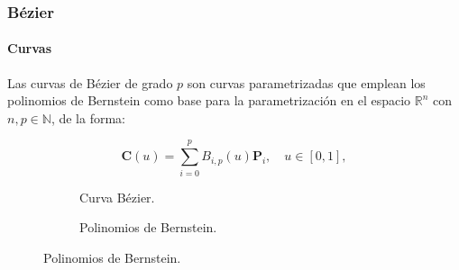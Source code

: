 \documentclass[compress]{beamer}
\newcommand\N{\mathbb{N}}
\newcommand\R{\mathbb{R}}
\begin{document}
\begin{frame}
	\frametitle{Bézier}
	\framesubtitle{Curvas} %
	
	\begin{definition}
		Las curvas de Bézier de grado $p$ son curvas parametrizadas que emplean los polinomios de Bernstein
		como base para la parametrización en el espacio $\R^n$ con $n,p \in \N$, de la forma:
		
		\vspace{-0.2cm}

		\begin{equation*}
			\mathbf{C}(u) = \sum_{i=0}^{p} B_{i,p}(u) \mathbf{P}_i, \quad u \in [0, 1],
		\end{equation*}
		

	\end{definition}
		\begin{figure}[H]\tiny
			\centering
			\begin{subfigure}[t]{0.32\textwidth}
				\centering
				
				\caption{Curva Bézier.}
			\end{subfigure}
			\begin{subfigure}[t]{0.32\textwidth}
				\centering
				
				\caption{Polinomios de Bernstein.}
			\end{subfigure}
		\end{figure}
\end{frame}
\end{document}
